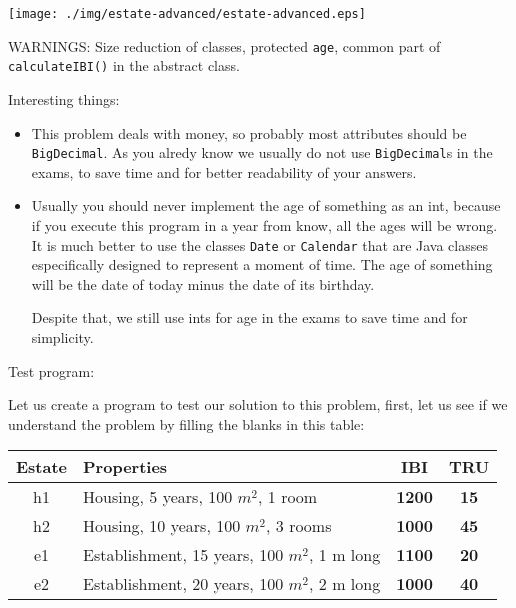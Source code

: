 \documentclass[a4paper, 9pt]{extarticle}
\begin{document}
\begin{center}
\texttt{[image: ./img/estate-advanced/estate-advanced.eps]}
\end{center}

WARNINGS: Size reduction of classes, protected \texttt{age}, common part of
\texttt{calculateIBI()} in the abstract class.

\newpage


Interesting things:

\begin{itemize}

  \item This problem deals with money, so probably most attributes should be
    \texttt{BigDecimal}. As you alredy know we usually do not use
    \texttt{BigDecimal}s in the exams, to save time and for better readability
    of your answers.

  \item Usually you should never implement the age of something as an int,
    because if you execute this program in a year from know, all the ages will
    be wrong. It is much better to use the classes \texttt{Date} or
    \texttt{Calendar} that are Java classes especifically designed to represent
    a moment of time. The age of something will be the date of today minus the
    date of its birthday.

    Despite that, we still use ints for age in the exams to save time and for
    simplicity.

\end{itemize}


Test program:

Let us create a program to test our solution to this problem, first, let us see
if we understand the problem by filling the blanks in this table:

\begin{center}
\begin{tabular}{|c|l|c|c|}
  \hline
  Estate & Properties & IBI & TRU \\
  \hline
  h1     & Housing, 5 years, 100 $m^{2}$, 1 room & \textbf{1200} & \textbf{15} \\
  h2     & Housing, 10 years, 100 $m^{2}$, 3 rooms & \textbf{1000} & \textbf{45} \\
  e1     & Establishment, 15 years, 100 $m^{2}$, 1 m long & \textbf{1100} & \textbf{20} \\
  e2     & Establishment, 20 years, 100 $m^{2}$, 2 m long & \textbf{1000} & \textbf{40} \\
  \hline
\end{tabular}
\end{center}
\end{document}
